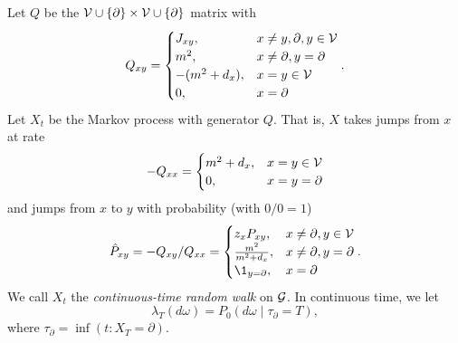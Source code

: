 

Let $Q$ be the $\mathcal{V}\cup\{\partial\}\times\mathcal{V}\cup\{\partial\}$ matrix with
\begin{equation}
Q_{xy}
  =
\begin{cases}
J_{xy},       & x \ne y, \partial, y \in \mathcal{V} \\
m^2,          & x \ne \partial, y = \partial \\
-(m^2 + d_x), & x = y \in \mathcal{V} \\
0,            & x = \partial
\end{cases}.
\end{equation}
Let $X_t$ be the Markov process with generator $Q$.
That is, $X$ takes jumps from $x$ at rate
\begin{equation}
-Q_{xx}
  =
\begin{cases}
m^2 + d_x,    & x = y \in \mathcal{V} \\
0,            & x = y = \partial
\end{cases}
\end{equation}
and jumps from $x$ to $y$ with probability (with $0/0 = 1$)
\begin{equation}
\hat P_{xy}
  =
-Q_{xy} / Q_{xx}
  =
\begin{cases}
z_x P_{xy},             & x \ne \partial, y \in \vertices \\
\frac{m^2}{m^2 + d_x},  & x \ne \partial, y = \partial \\
\1_{y=\partial},        & x = \partial
\end{cases}.
\end{equation}
We call $X_t$ the \emph{continuous-time random walk} on $\mathcal{G}$.
In continuous time, we let
\begin{equation}
\lambda_T(d\omega) = P_0(d\omega \mid \tau_\partial = T),
\end{equation}
where $\tau_\partial = \inf(t : X_T = \partial)$.

